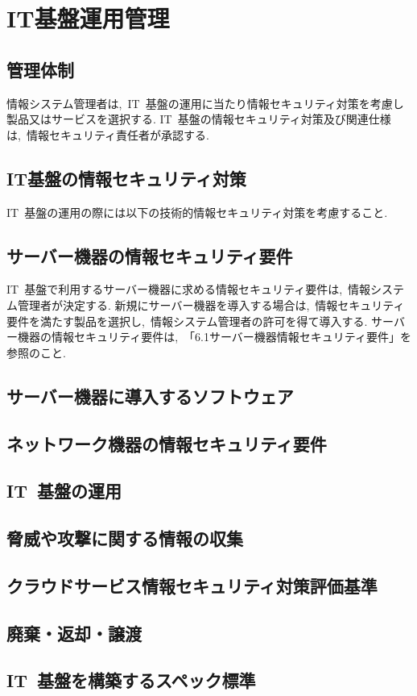 \chapter{IT基盤運用管理}
\section{管理体制}
情報システム管理者は,~IT~基盤の運用に当たり情報セキュリティ対策を考慮し製品又はサービスを選択する.
IT~基盤の情報セキュリティ対策及び関連仕様は,~情報セキュリティ責任者が承認する.
\section{IT基盤の情報セキュリティ対策}
IT~基盤の運用の際には以下の技術的情報セキュリティ対策を考慮すること.

\section{サーバー機器の情報セキュリティ要件}
IT~基盤で利用するサーバー機器に求める情報セキュリティ要件は,~情報システム管理者が決定する.
新規にサーバー機器を導入する場合は,~情報セキュリティ要件を満たす製品を選択し,~情報システム管理者の許可を得て導入する.
サーバー機器の情報セキュリティ要件は,~「6.1サーバー機器情報セキュリティ要件」を参照のこと.

\section{サーバー機器に導入するソフトウェア}
\section{ネットワーク機器の情報セキュリティ要件}
\section{IT~基盤の運用}
\section{脅威や攻撃に関する情報の収集}
\section{クラウドサービス情報セキュリティ対策評価基準}
\section{廃棄・返却・譲渡}
\section{IT~基盤を構築するスペック標準}